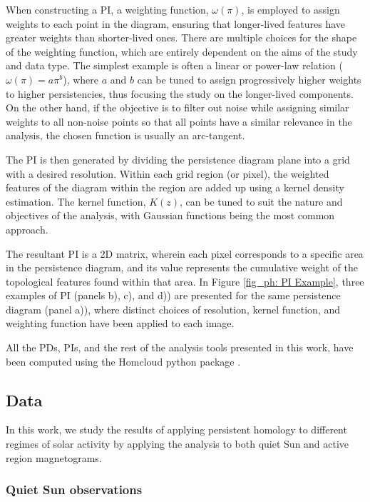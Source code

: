 \documentclass[12pt]{mythesis}
\begin{document}
When constructing a PI, a weighting function, $\omega (\pi)$, is employed to assign weights to each point in the diagram, ensuring that longer-lived features have greater weights than shorter-lived ones. There are multiple choices for the shape of the weighting function, which are entirely dependent on the aims of the study and data type. The simplest example is often a linear or power-law relation ($\omega (\pi) = a \pi ^b$), where $a$ and $b$ can be tuned to assign progressively higher weights to higher persistencies, thus focusing the study on the longer-lived components. On the other hand, if the objective is to filter out noise while assigning similar weights to all non-noise points so that all points have a similar relevance in the analysis, the chosen function is usually an arc-tangent.

The PI is then generated by dividing the persistence diagram plane into a grid with a desired resolution. Within each grid region (or pixel), the weighted features of the diagram within the region are added up using a kernel density estimation. The kernel function, $K (z)$, can be tuned to suit the nature and objectives of the analysis, with Gaussian functions being the most common approach. 

The resultant PI is a 2D matrix, wherein each pixel corresponds to a specific area in the persistence diagram, and its value represents the cumulative weight of the topological features found within that area. In Figure \ref{fig_ph: PI Example}, three examples of PI (panels b), c), and d)) are presented for the same persistence diagram (panel a)), where distinct choices of resolution, kernel function, and weighting function have been applied to each image.




All the PDs, PIs, and the rest of the analysis tools presented in this work, have been computed using the Homcloud python package \citep{homcloud}.


\subsection{Data}

In this work, we study the results of applying persistent homology to different regimes of solar activity by applying the analysis to both quiet Sun and active region magnetograms.

\subsubsection{Quiet Sun observations}
\end{document}
